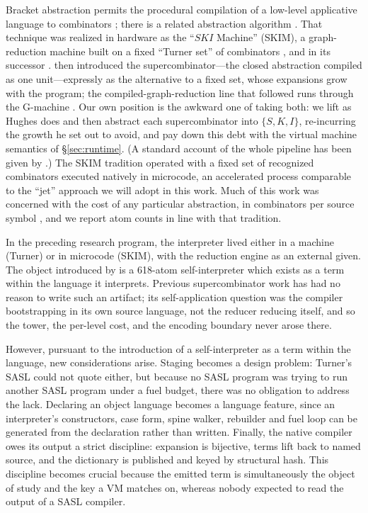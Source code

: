 \documentclass[english,submission,code=tt]{programming}
\begin{document}
Bracket abstraction permits the procedural compilation of a low-level 
applicative language to combinators \citep{Turner1979}; there is a 
related abstraction algorithm \citep{Turner1979b}.  That technique was 
realized in hardware as the ``$SKI$ Machine'' (SKIM), a 
graph-reduction machine built on a fixed ``Turner set'' of combinators 
\citep{ClarkeEtAl1980}, and in its successor 
\citep{StoyeClarkeNorman1984,Stoye1985}.  \citet{Hughes1982} then 
introduced the supercombinator---the closed abstraction compiled as 
one unit---expressly as the alternative to a fixed set, whose 
expansions grow with the program; the compiled-graph-reduction line 
that followed runs through the G-machine \citep{Johnsson1984}.  Our 
own position is the awkward one of taking both: we lift as Hughes does 
and then abstract each supercombinator into $\{S,K,I\}$, re-incurring 
the growth he set out to avoid, and pay down this debt with the virtual 
machine semantics of \S\ref{sec:runtime}.  (A standard account of the 
whole pipeline has been given by \citet{PeytonJones1987}.)  The SKIM 
tradition operated with a fixed set of recognized combinators executed 
natively in microcode, an accelerated process comparable to the ``jet''
approach we will adopt in this work.  Much of this work was concerned
with the cost of any particular abstraction, in combinators per source 
symbol \citep{Noshita1985,JoyRaywardSmithBurton1985}, and we report atom
counts in line with that tradition.

In the preceding research program, the interpreter lived either in a 
machine (Turner) or in microcode (SKIM), with the reduction engine as 
an external given.
The object introduced by \citet{Davis2027} is a 618-atom 
self-interpreter which exists as a term within the language it 
interprets.  Previous supercombinator work has had no reason to write
such an artifact; its self-application question was the compiler
bootstrapping in its own source language, not the reducer reducing
itself, and so the tower, the per-level cost, and the encoding boundary
never arose there.

However, pursuant to the introduction of a self-interpreter as a term 
within the language, new considerations arise.  Staging becomes a design 
problem: Turner's SASL could not quote either, but because no SASL 
program was trying to run another SASL program under a fuel budget, 
there was no obligation to address the lack.  Declaring an object 
language becomes a language feature, since an interpreter's  
constructors, case form, spine walker, rebuilder and fuel loop can be 
generated from the declaration rather than written.  Finally, the native 
compiler owes its output a strict discipline:  expansion is bijective, 
terms lift back to named source, and the dictionary is published and 
keyed by structural hash.  This discipline becomes crucial because the 
emitted term is simultaneously the object of study and the key a VM 
matches on, whereas nobody expected to read the output of a SASL  
compiler.
\end{document}
